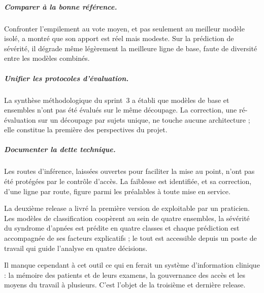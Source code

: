 \subparagraph{Comparer à la bonne référence.} Confronter l'empilement au vote moyen, et pas
seulement au meilleur modèle isolé, a montré que son apport est réel mais modeste. Sur la
prédiction de sévérité, il dégrade même légèrement la meilleure ligne de base, faute de
diversité entre les modèles combinés.

\subparagraph{Unifier les protocoles d'évaluation.} La synthèse méthodologique du sprint~3
a établi que modèles de base et ensembles n'ont pas été évalués sur le même découpage. La
correction, une ré-évaluation sur un découpage par sujets unique, ne touche aucune
architecture ; elle constitue la première des perspectives du projet.

\subparagraph{Documenter la dette technique.} Les routes d'inférence, laissées ouvertes
pour faciliter la mise au point, n'ont pas été protégées par le contrôle d'accès. La
faiblesse est identifiée, et sa correction, d'une ligne par route, figure parmi les
préalables à toute mise en service.


La deuxième release a livré la première version de \hypnoria{} exploitable par un
praticien. Les modèles de classification coopèrent au sein de quatre ensembles, la sévérité
du syndrome d'apnées est prédite en quatre classes et chaque prédiction est accompagnée de
ses facteurs explicatifs ; le tout est accessible depuis un poste de travail qui guide
l'analyse en quatre décisions.

Il manque cependant à cet outil ce qui en ferait un système d'information clinique : la
mémoire des patients et de leurs examens, la gouvernance des accès et les moyens du travail
à plusieurs. C'est l'objet de la troisième et dernière release.
